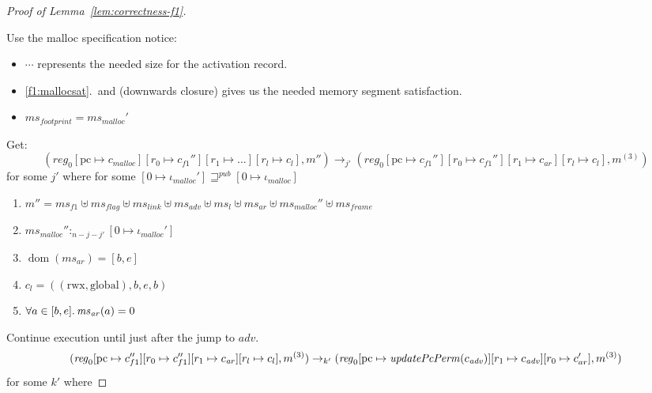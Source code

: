 \documentclass[a4paper]{article}
\newcommand{\update}[2]{[#1 \mapsto #2]}
\DeclareMathOperator{\dom}{dom}
\newcommand{\var}[1]{\mathit{#1}}
\newcommand{\hs}{\var{ms}}
\newcommand{\ms}{\hs}
\newcommand{\pcreg}{\mathrm{pc}}
\newcommand{\reg}{\var{reg}}
\newcommand{\heap}{\var{mem}}
\newcommand{\adv}{\var{adv}}
\newcommand{\flag}{\var{flag}}
\newcommand{\plainfun}[2]{
  \ifthenelse{\equal{#2}{}}
  {\mathit{#1}}
  {\mathit{#1}(#2)}
}
\newcommand{\updatePcPerm}[1]{\plainfun{updatePcPerm}{#1}}
\newcommand{\futurewk}{\mathbin{\sqsupseteq}^{\var{pub}}}
\newcommand{\heapSat}[3][\heap]{#1 :_{#2} #3}
\newcommand{\codelabel}[1]{\mathit{#1}}
\newcommand{\malloc}{\codelabel{malloc}}
\newcommand{\plainperm}[1]{\mathrm{#1}}
\newcommand{\rwx}{\plainperm{rwx}}
\newcommand{\glob}{\plainperm{global}}
\newcommand{\step}[1][]{\rightarrow_{#1}}
\begin{document}
\begin{proof}[Proof of Lemma~\ref{lem:correctness-f1}]
\begin{enumerate}[resume]
                \end{enumerate}
                Use the malloc specification notice:
                \begin{itemize}
                \item $\cdots$ represents the needed size for the activation record. 
                \item \ref{f1:mallocsat}.\ and (downwards closure) gives us the needed memory segment satisfaction.
                \item $\ms_{\var{footprint}} =  \ms_\malloc' $
                \end{itemize}
                Get:
                \[
                  (\reg_0\update{\pcreg}{c_\malloc}\update{r_0}{c_{f1}''}\update{r_1}{\dots}\update{r_l}{c_l},m'')
                  \step[j']
                  (\reg_0\update{\pcreg}{c_{f1}''}\update{r_0}{c_{f1}''}\update{r_1}{c_{\var{ar}}}\update{r_l}{c_l},m^{(3)})
                \]
                for some $j'$ where for some $[0 \mapsto \iota_{\malloc}'] \futurewk [0 \mapsto \iota_{\malloc}]$
                \begin{enumerate}[resume]
                \item $m'' = \hs_{f1} \uplus 
                  \hs_\flag \uplus                
                  \ms_{\var{link}} \uplus 
                  \hs_\adv \uplus 
                  \ms_{l} \uplus
                  \ms_{\var{ar}} \uplus
                  \ms_{\malloc}'' \uplus 
                  \hs_{\var{frame}} $
                \item $\heapSat[\ms_{\malloc}'']{n-j-j'}{[0 \mapsto \iota_{\malloc}']}$ \label{f1:mallocsat}
                \item $\dom(\hs_{\var{ar}}) = [b,e]$
                \item $c_l = ((\rwx,\glob),b,e,b)$ \label{test}
                \item $\forall a \in [b,e] \ldotp \ms_{\var{ar}}(a) = 0$
                \end{enumerate}
                Continue execution until just after the jump to $\var{adv}$.
                \[
                  (\reg_0\update{\pcreg}{c_{f1}''}\update{r_0}{c_{f1}''}\update{r_1}{c_{\var{ar}}}\update{r_l}{c_l},m^{(3)})
                  \step[k']
                  (\reg_0\update{\pcreg}{\updatePcPerm{c_{\var{adv}}}}\update{r_1}{c_{\var{adv}}}\update{r_0}{c_{ar}'},m^{(3)})
                \]
                for some $k'$ where
\end{proof}
\end{document}
